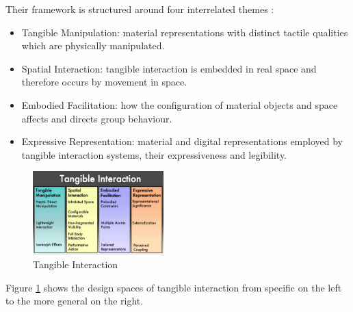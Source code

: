 Their framework is structured around four interrelated themes \cite{hornecker06}:
\begin{itemize}
\item Tangible Manipulation:  material representations with distinct tactile qualities which are physically manipulated.
\item Spatial Interaction: tangible interaction is embedded in real space and therefore occurs by movement in space.
\item Embodied Facilitation: how the configuration of material objects and space affects and directs group behaviour.
\item Expressive Representation: material and digital representations employed by tangible interaction systems, their expressiveness and legibility.
\end{itemize}

\begin{figure}
\centering
\includegraphics[width=0.45\textwidth]{figures/tangibleInteraction.png}
\caption{Tangible Interaction}
\label{fig:tangibleInteraction}
\end{figure}

Figure \ref{fig:tangibleInteraction} shows the design spaces of tangible interaction from specific on the left to the more general on the right. 

